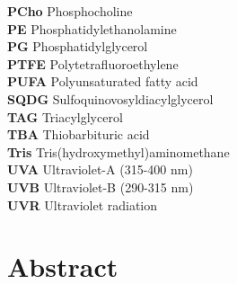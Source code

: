 \begin{tabbing}
\textbf{PCho}\> Phosphocholine\\
\textbf{PE}\> Phosphatidylethanolamine\\
\textbf{PG}\> Phosphatidylglycerol\\
\textbf{PTFE}\> Polytetrafluoroethylene\\
\textbf{PUFA}\> Polyunsaturated fatty acid\\
\textbf{SQDG}\> Sulfoquinovosyldiacylglycerol\\
\textbf{TAG}\> Triacylglycerol\\
\textbf{TBA}\> Thiobarbituric acid\\
\textbf{Tris}\> Tris(hydroxymethyl)aminomethane\\
\textbf{UVA}\> Ultraviolet-A (315-400 nm)\\
\textbf{UVB}\> Ultraviolet-B (290-315 nm)\\
\textbf{UVR}\> Ultraviolet radiation
\end{tabbing}
\clearpage
\section{Abstract}

